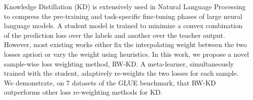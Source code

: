 Knowledge Distillation (KD) is extensively used in Natural Language Processing to compress the pre-training and task-specific fine-tuning phases of large neural language models. A student model is trained to minimize a convex combination of the prediction loss over the labels and another over the teacher output. However, most existing works either fix the interpolating weight between the two losses apriori or vary the weight using heuristics. In this work, we propose a novel sample-wise loss weighting method, RW-KD. A meta-learner, simultaneously trained with the student, adaptively re-weights the two losses for each sample. We demonstrate, on 7 datasets of the GLUE benchmark, that RW-KD outperforms other loss re-weighting methods for KD.
